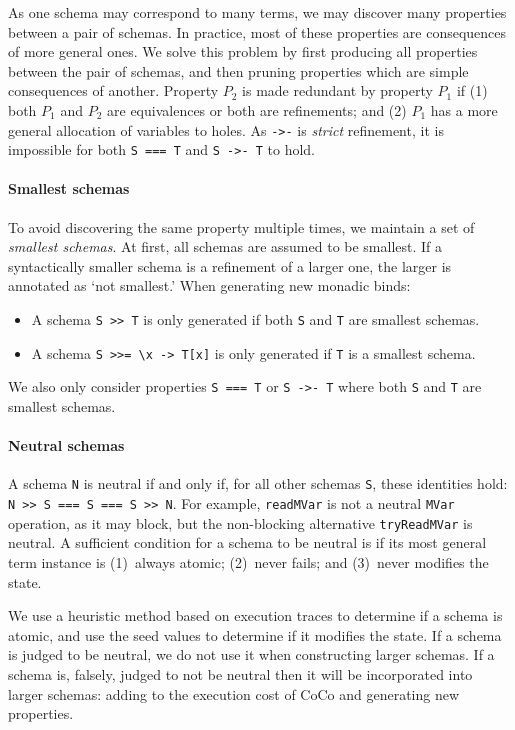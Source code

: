 As one schema may correspond to many terms, we may discover many
properties between a pair of schemas.  In practice, most of these
properties are consequences of more general ones.  We solve this
problem by first producing all properties between the pair of schemas,
and then pruning properties which are simple consequences of another.
Property $P_2$ is made redundant by property $P_1$ if (1) both $P_1$
and $P_2$ are equivalences or both are refinements; and (2) $P_1$ has
a more general allocation of variables to holes.  As \verb|->-| is
\emph{strict} refinement, it is impossible for both \verb|S === T| and
\verb|S ->- T| to hold.

\paragraph{Smallest schemas}
To avoid discovering the same property multiple times, we maintain a
set of \emph{smallest schemas}.  At first, all schemas are assumed to
be smallest.  If a syntactically smaller schema is a refinement of a
larger one, the larger is annotated as `not smallest.'  When
generating new monadic binds:

\begin{itemize}
\item A schema \verb|S >> T| is only generated if both \verb|S| and
  \verb|T| are smallest schemas.
\item A schema \verb|S >>= \x -> T[x]| is only generated if \verb|T|
  is a smallest schema.
\end{itemize}

We also only consider properties \verb|S === T| or \verb|S ->- T|
where both \verb|S| and \verb|T| are smallest schemas.

\paragraph{Neutral schemas}
A schema \verb|N| is neutral if and only if, for all other schemas
\verb|S|, these identities hold: \verb|N >> S === S === S >> N|.  For
example, \verb|readMVar| is not a neutral \verb|MVar| operation, as it
may block, but the non-blocking alternative \verb|tryReadMVar| is
neutral.  A sufficient condition for a schema to be neutral is if its
most general term instance is (1)~always atomic; (2)~never fails; and
(3)~never modifies the state.

We use a heuristic method based on execution traces to determine if a
schema is atomic, and use the seed values to determine if it modifies
the state.  If a schema is judged to be neutral, we do not use it when
constructing larger schemas.  If a schema is, falsely, judged to not
be neutral then it will be incorporated into larger schemas: adding to
the execution cost of CoCo and generating new properties.

